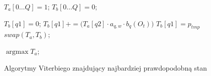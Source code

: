 \documentclass[11pt]{article}
\DeclareMathOperator*{\argmax}{\arg\max}   %
\begin{document}
		  \begin{figure}
			  \begin{algorithmic}[1]
		  		
		  		
		  	  	  \STATE $T_a[0 \ldots Q] = 1$;
		  		  \STATE $T_b[0 \ldots Q] = 0$;
		  		
				  		  \STATE $T_b[q1] = 0$;
					  		  \STATE $T_b[q1] += \bigg( T_a[q2]\cdot a_{q,w}\cdot b_q(O_t) \bigg)$					  		  
				  		  \ENDFOR
				  		  \STATE $T_b[q1] = p_{tmp}$
			  		  \ENDFOR
			  		  \STATE $swap(T_a, T_b)$;
		  		  \ENDFOR
		  		
		  		  \RETURN $\argmax{T_a}$;
			  \end{algorithmic}
			  \caption{Algorytmy Viterbiego znajdujący najbardziej prawdopodobną stan}
		  	  \label{alg:viterbi2}
		  \end{figure}	   
		   
\end{document}
